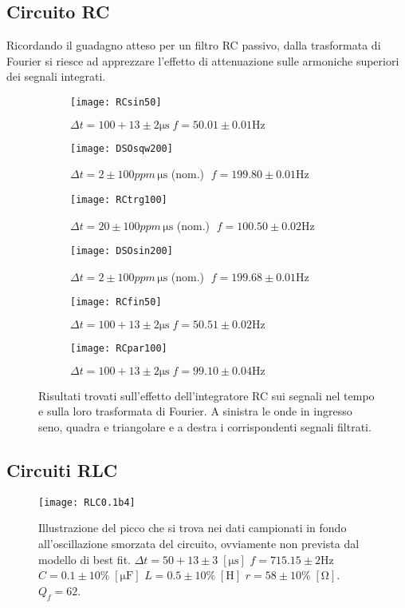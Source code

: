 \documentclass{article}[a4paper, oneside, 11pt]
\begin{document}
\subsection{Circuito RC}
Ricordando il guadagno atteso per un filtro RC passivo, dalla trasformata
di Fourier si riesce ad apprezzare l'effetto di attenuazione sulle armoniche
superiori dei segnali integrati.
\begin{figure}[!htb]
\centering
	\begin{subfigure}{.5\textwidth}
	\texttt{[image: RCsin50]}
	\caption{$\Delta t = 100 + 13 \pm 2 \si{\us} \; f = 50.01 \pm 0.01 \si{\Hz}$}
	\texttt{[image: DSOsqw200]}
	\caption{$\Delta t = 2 \pm 100 \si{ppm \, \us}$ (nom.)
	$\; f = 199.80 \pm 0.01 \si{\Hz}$}
	\texttt{[image: RCtrg100]}
	\caption{$\Delta t = 20 \pm 100 \si{ppm \, \us}$ (nom.)
	$ \; f = 100.50 \pm 0.02 \si{\Hz}$}
\label{fig: RCin}
	\end{subfigure}%
	\begin{subfigure}{.5\textwidth}
	\texttt{[image: DSOsin200]}
	\caption{$\Delta t = 2 \pm 100 \si{ppm \, \us}$ (nom.)
	$\; f = 199.68 \pm 0.01 \si{\Hz}$}
	\texttt{[image: RCfin50]}
	\caption{$\Delta t = 100 + 13 \pm 2 \si{\us} \; f = 50.51 \pm 0.02 \si{\Hz}$}
	\texttt{[image: RCpar100]}
	\caption{$\Delta t = 100 + 13 \pm 2 \si{\us} \; f = 99.10 \pm 0.04 \si{\Hz}$}
\label{fig: Rcint}
	\end{subfigure}%
	\caption{Risultati trovati sull'effetto dell'integratore RC sui segnali
			nel tempo e sulla loro trasformata di Fourier. A sinistra le
			onde in ingresso seno, quadra e triangolare e a destra i corrispondenti 
		 	segnali filtrati. \label{fig: RCall}}
\end{figure}

\subsection{Circuiti RLC}
\begin{figure}[!htb]
\centering
	\texttt{[image: RLC0.1b4]}
	\caption{Illustrazione del picco che si trova nei dati campionati
			in fondo all'oscillazione smorzata del circuito, ovviamente
			non prevista dal modello di best fit. 
			$\Delta t = 50 + 13 \pm 3 \; [\si{\us}]$ $f = 715.15 \pm 2 \si{\Hz}$
			$C = 0.1 \pm 10\% \; [\si{\micro\F}]$ $L = 0.5 \pm 10 \% \;
			[\si{\henry}]$ $r = 58 \pm 10\%	\; [\si{\ohm}]$.
			$Q_f = 62$.	\label{fig: RLC0.1b5}}
\end{figure}
\end{document}
